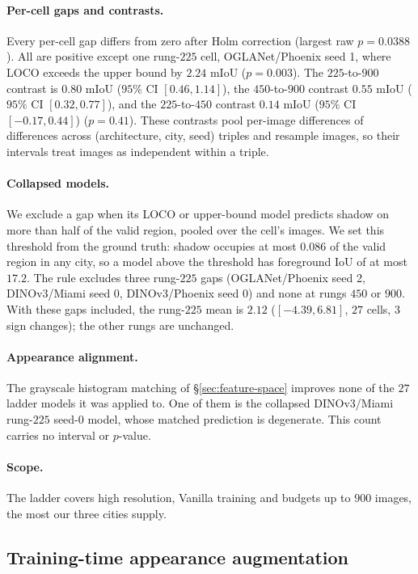 \paragraph{Per-cell gaps and contrasts.} Every per-cell gap differs from zero
after Holm correction (largest raw $p = 0.0388$).  All are positive except one
rung-$225$ cell, OGLANet/Phoenix seed 1, where LOCO exceeds the upper bound by
$2.24$ mIoU ($p = 0.003$).  The $225$-to-$900$ contrast is $0.80$ mIoU ($95\%$ CI $[0.46, 1.14]$), the $450$-to-$900$
contrast $0.55$ mIoU ($95\%$ CI $[0.32, 0.77]$), and the
$225$-to-$450$ contrast $0.14$ mIoU ($95\%$ CI $[-0.17, 0.44]$) ($p = 0.41$).
These contrasts pool per-image differences of differences across
(architecture, city, seed) triples and resample images, so their intervals treat
images as independent within a triple.

\paragraph{Collapsed models.} We exclude a gap when its LOCO or upper-bound
model predicts shadow on more than half of the valid region, pooled over the
cell's images.  We set this threshold from the ground truth: shadow occupies at
most $0.086$ of the valid region in any city, so a model above the threshold has
foreground IoU of at most $17.2$.  The rule excludes three rung-$225$ gaps
(OGLANet/Phoenix seed 2, DINOv3/Miami seed 0, DINOv3/Phoenix seed 0) and none at
rungs $450$ or $900$.  With these gaps included, the rung-$225$ mean is $2.12$
($[-4.39, 6.81]$, $27$ cells, $3$ sign changes); the other rungs are unchanged.

\paragraph{Appearance alignment.} The grayscale histogram matching of
\S\ref{sec:feature-space} improves none of the $27$ ladder models it was applied
to.  One of them is the collapsed DINOv3/Miami rung-$225$ seed-$0$ model, whose
matched prediction is degenerate.  This count carries no interval or
$p$-value.

\paragraph{Scope.} The ladder covers high resolution, Vanilla training and
budgets up to $900$ images, the most our three cities supply.

\subsection{Training-time appearance augmentation}
\label{app:aug-stress}

